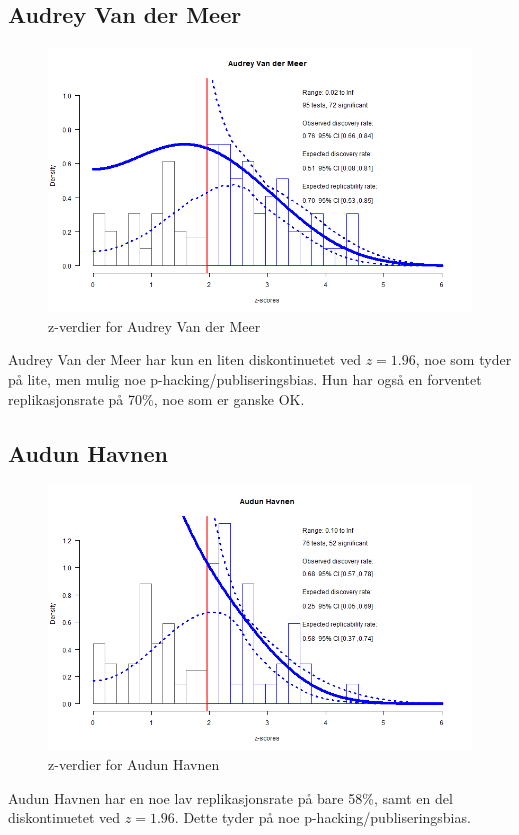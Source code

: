 \documentclass[doc,norsk]{apa7}
\begin{document}
\subsection{Audrey Van der Meer}
\begin{figure}[h!]
    \centering
    \includegraphics[width=\textwidth]{images/Audrey Van der Meer.png}
    \caption{z-verdier for Audrey Van der Meer}
\end{figure}
Audrey Van der Meer har kun en liten diskontinuetet ved $z=1.96$, noe som tyder på lite, men mulig noe p-hacking/publiseringsbias. Hun har også en forventet replikasjonsrate på 70\%, noe som er ganske OK.


\subsection{Audun Havnen}
\begin{figure}[h!]
    \centering
    \includegraphics[width=\textwidth]{images/Audun Havnen.png}
    \caption{z-verdier for Audun Havnen}
\end{figure}
Audun Havnen har en noe lav replikasjonsrate på bare 58\%, samt en del diskontinuetet ved $z=1.96$. Dette tyder på noe p-hacking/publiseringsbias.
\end{document}
